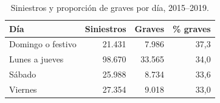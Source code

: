 \begin{table}[h]\centering\small
\caption{Siniestros y proporción de graves por día, 2015--2019.}\label{tab:dia}
\begin{tabular}{lrrr}
\toprule
Día & Siniestros & Graves & \% graves \\
\midrule
Domingo o festivo & 21.431 & 7.986 & 37,3 \\
Lunes a jueves & 98.670 & 33.565 & 34,0 \\
Sábado & 25.988 & 8.734 & 33,6 \\
Viernes & 27.354 & 9.018 & 33,0 \\
\bottomrule
\end{tabular}
\end{table}